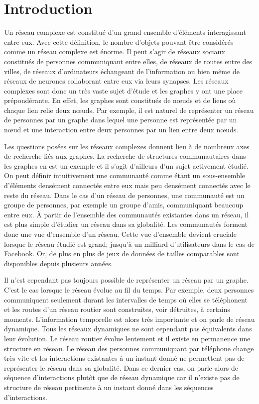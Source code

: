 
\chapter*{Introduction}

Un réseau complexe est constitué d'un grand ensemble d'éléments interagissant entre eux.
Avec cette définition, le nombre d'objets pouvant être considérés comme un réseau complexe est énorme.
Il peut s'agir de réseaux sociaux constitués de personnes communiquant entre elles, de réseaux de routes entre des villes, de réseaux d'ordinateurs échangeant de l'information ou bien même de réseaux de neurones collaborant entre eux via leurs synapses.
Les réseaux complexes sont donc un très vaste sujet d'étude et les graphes y ont une place prépondérante.
En effet, les graphes sont constitués de n\oe{}uds et de liens où chaque lien relie deux n\oe{}uds.
Par exemple, il est naturel de représenter un réseau de personnes par un graphe dans lequel une personne est représentée par un n\oe{}ud et une interaction entre deux personnes par un lien entre deux n\oe{}uds.

Les questions posées sur les réseaux complexes donnent lieu à de nombreux axes de recherche liés aux graphes.
La recherche de structures communautaires dans les graphes en est un exemple et il s'agit d'ailleurs d'un sujet activement étudié.
On peut définir intuitivement une communauté comme étant un sous-ensemble d’éléments densément connectés entre eux mais peu densément connectés avec le reste du réseau.
Dans le cas d'un réseau de personnes, une communauté est un groupe de personnes, par exemple un groupe d'amis, communiquant beaucoup entre eux.
\`A partir de l'ensemble des communautés existantes dans un réseau, il est plus simple d'étudier un réseau dans sa globalité.
Les communautés forment donc une vue d'ensemble d'un réseau.
Cette vue d'ensemble devient cruciale lorsque le réseau étudié est grand; jusqu'à un milliard d'utilisateurs dans le cas de Facebook.
Or, de plus en plus de jeux de données de tailles comparables sont disponibles depuis plusieurs années.


Il n'est cependant pas toujours possible de représenter un réseau par un graphe.
C'est le cas lorsque le réseau évolue au fil du temps.
Par exemple, deux personnes communiquent seulement durant les intervalles de temps où elles se téléphonent et les routes d'un réseau routier sont construites, voir détruites, à certains moments.
L'information temporelle est alors très importante et on parle de réseau dynamique.
Tous les réseaux dynamiques ne sont cependant pas équivalents dans leur évolution.
Le réseau routier évolue lentement et il existe en permanence une structure en réseau.
Le réseau des personnes communiquant par téléphone change très vite et les interactions existantes à un instant donné ne permettent pas de représenter le réseau dans sa globalité.
Dans ce dernier cas, on parle alors de séquence d'interactions plutôt que de réseau dynamique car il n'existe pas de structure de réseau pertinente à un instant donné dans les séquences d'interactions.


